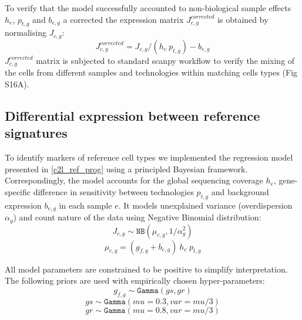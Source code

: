 \documentclass[11pt,a4paper]{article}
\begin{document}
\begin{enumerate}
    To verify that the model successfully accounted to non-biological sample effects $h_e$, $p_{t,g}$ and $b_{e,g}$ a corrected the expression matrix $J^{corrected}_{c,g}$ is obtained by normalising $J_{c,g}$:
    \begin{equation} \label{eq:c2l_ref_prog:3}
    J^{corrected}_{c,g} = J_{c,g} / ({h_e} \: p_{t,g}) - b_{e,g}
    \end{equation}
    $J^{corrected}_{c,g}$ matrix is subjected to standard scanpy workflow \cite{wolf_scanpy_2018} to verify the mixing of the cells from different samples and technologies within matching cells types (Fig S16A).

\end{enumerate}

\subsection{Differential expression between reference signatures} \label{c2l_ref_prog_diff_expression}

To identify markers of reference cell types we implemented the regression model presented in \ref{c2l_ref_prog} using a principled Bayesian framework. Correspondingly, the model accounts for the global sequencing coverage $h_e$, gene-specific difference in sensitivity between technologies $p_{t,g}$ and background expression $b_{e,g}$ in each sample $e$. It models unexplained variance (overdispersion $\alpha_g$) and count nature of the data using Negative Binomial distribution:
\begin{equation} \label{eq:c2l_ref_prog_diff:1}
J_{c,g} \sim \mathtt{NB}(\mu_{c,g}, 1 / \alpha_g^2)
\end{equation}
\begin{equation} \label{eq:c2l_ref_prog_diff:2}
\mu_{c,g} = (g_{f,g} + b_{e,g}) \: {h_e} \: p_{t,g}
\end{equation}

All model parameters are constrained to be positive to simplify interpretation. The following priors are used with empirically chosen hyper-parameters:
\begin{equation} \label{eq:c2l_ref_prog_diff:3}
g_{f,g} \sim \mathtt{Gamma}(gs, gr)
\end{equation}
\begin{equation} \label{eq:c2l_ref_prog_diff:4}
gs \sim \mathtt{Gamma}(mu=0.3, var=mu/3)
\end{equation}
\begin{equation} \label{eq:c2l_ref_prog_diff:4}
gr \sim \mathtt{Gamma}(mu=0.8, var=mu/3)
\end{equation}
\end{document}

